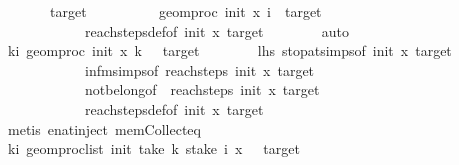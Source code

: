 \begin{isabellebody}
\ \ \ \ \ \ \ {\isacharparenleft}{\kern0pt}target{\isacharparenright}{\kern0pt}\ {\isasymnoteq}\ {\isacharbraceleft}{\kern0pt}{\isacharbraceright}{\kern0pt}{\isachardoublequoteclose}\isanewline
\ \ \ \ \ \ \isamarkupfalse%
\ {\isacartoucheopen}geom{\isacharunderscore}{\kern0pt}proc\ init\ x\ i\ {\isacharequal}{\kern0pt}\ target{\isacartoucheclose}\isanewline
\ \ \ \ \ \ \ \ \ \ \ \ reach{\isacharunderscore}{\kern0pt}steps{\isacharunderscore}{\kern0pt}def{\isacharbrackleft}{\kern0pt}of\ init\ x\ target{\isacharbrackright}{\kern0pt}\isanewline
\ \ \ \ \ \ \isamarkupfalse%
\ auto\isanewline
\ \ \ \ \isamarkupfalse%
\ \isamarkupfalse%
\ {\isachardoublequoteopen}{\isasymforall}k{\isacharless}{\kern0pt}i{\isachardot}{\kern0pt}\ geom{\isacharunderscore}{\kern0pt}proc\ init\ x\ k\ {\isasymnotin}\ {\isacharbraceleft}{\kern0pt}{}{\isacharcomma}{\kern0pt}\ target{\isacharbraceright}{\kern0pt}{\isachardoublequoteclose}\isanewline
\ \ \ \ \ \ \isamarkupfalse%
\ lhs{}\ stop{\isacharunderscore}{\kern0pt}at{\isachardot}{\kern0pt}simps{\isacharbrackleft}{\kern0pt}of\ init\ x\ target{\isacharbrackright}{\kern0pt}\isanewline
\ \ \ \ \ \ \ \ \ \ \ \ infm{\isachardot}{\kern0pt}simps{\isacharbrackleft}{\kern0pt}of\ {\isachardoublequoteopen}reach{\isacharunderscore}{\kern0pt}steps\ init\ x\ target{\isachardoublequoteclose}{\isacharbrackright}{\kern0pt}\isanewline
\ \ \ \ \ \ \ \ \ \ \ \ not{\isacharunderscore}{\kern0pt}belong{\isacharbrackleft}{\kern0pt}of\ {\isacharunderscore}{\kern0pt}\ {\isachardoublequoteopen}reach{\isacharunderscore}{\kern0pt}steps\ init\ x\ target{\isachardoublequoteclose}{\isacharbrackright}{\kern0pt}\isanewline
\ \ \ \ \ \ \ \ \ \ \ \ reach{\isacharunderscore}{\kern0pt}steps{\isacharunderscore}{\kern0pt}def{\isacharbrackleft}{\kern0pt}of\ init\ x\ target{\isacharbrackright}{\kern0pt}\isanewline
\ \ \ \ \ \ \isamarkupfalse%
\ {\isacharparenleft}{\kern0pt}metis\ enat{\isachardot}{\kern0pt}inject\ mem{\isacharunderscore}{\kern0pt}Collect{\isacharunderscore}{\kern0pt}eq{\isacharparenright}{\kern0pt}\isanewline
\ \ \ \ \isamarkupfalse%
\ \isamarkupfalse%
\ {\isachardoublequoteopen}{\isasymforall}k{\isacharless}{\kern0pt}i{\isachardot}{\kern0pt}\ geom{\isacharunderscore}{\kern0pt}proc{\isacharunderscore}{\kern0pt}list\ {\isacharparenleft}{\kern0pt}init{\isacharparenright}{\kern0pt}\ {\isacharparenleft}{\kern0pt}take\ k\ {\isacharparenleft}{\kern0pt}stake\ i\ x{\isacharparenright}{\kern0pt}{\isacharparenright}{\kern0pt}\ {\isasymnotin}\ {\isacharbraceleft}{\kern0pt}{}{\isacharcomma}{\kern0pt}\ target{\isacharbraceright}{\kern0pt}{\isachardoublequoteclose}\isanewline

\end{isabellebody}

